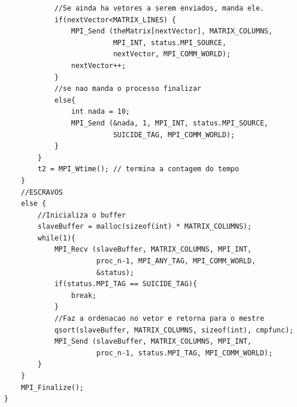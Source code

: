 \documentclass[12pt]{article}
\begin{document}
\begin{lstlisting}
            //Se ainda ha vetores a serem enviados, manda ele.
            if(nextVector<MATRIX_LINES) {
                MPI_Send (theMatrix[nextVector], MATRIX_COLUMNS,
                          MPI_INT, status.MPI_SOURCE,
                          nextVector, MPI_COMM_WORLD);
                nextVector++;
            }
            //se nao manda o processo finalizar
            else{
                int nada = 10;
                MPI_Send (&nada, 1, MPI_INT, status.MPI_SOURCE,
                          SUICIDE_TAG, MPI_COMM_WORLD);
            }
        }
	    t2 = MPI_Wtime(); // termina a contagem do tempo
    }
    //ESCRAVOS
    else {
        //Inicializa o buffer
        slaveBuffer = malloc(sizeof(int) * MATRIX_COLUMNS);
        while(1){
            MPI_Recv (slaveBuffer, MATRIX_COLUMNS, MPI_INT, 
                      proc_n-1, MPI_ANY_TAG, MPI_COMM_WORLD,
                      &status);
            if(status.MPI_TAG == SUICIDE_TAG){
                break;
            }
            //Faz a ordenacao no vetor e retorna para o mestre
            qsort(slaveBuffer, MATRIX_COLUMNS, sizeof(int), cmpfunc);
            MPI_Send (slaveBuffer, MATRIX_COLUMNS, MPI_INT,
                      proc_n-1, status.MPI_TAG, MPI_COMM_WORLD);
        }
    }
    MPI_Finalize();
}
\end{lstlisting}
\end{document}

